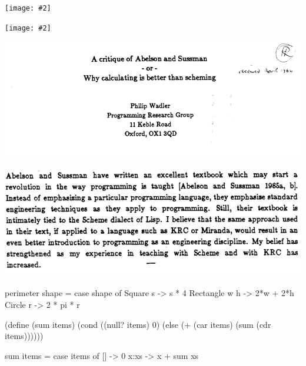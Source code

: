\documentclass[UKenglish,usenames,dvipsnames,svgnames,table,aspectratio=169,mathserif]{beamer}
\newcommand{\nl}{\vspace{\baselineskip}}
\newcommand{\pnl}{\pause \nl}
\newcommand{\imageslide}[2][1]{{
\begin{frame}\begin{center}
\texttt{[image: \#2]}
\end{center}\end{frame}
}}
\begin{document}
\imageslide[0.6]{language-levels.png}

\imageslide[0.5]{design-recipe.png}



\begin{frame}
\centering
\includegraphics[scale=0.5]{wadler-title.png}
\end{frame}


\begin{frame}
\centering
\includegraphics[scale=0.55]{wadler-abstract.png}
\end{frame}

\begin{frame}[fragile]
\begin{haskellcode}
perimeter shape =
  case shape of
    Square s      -> s * 4
    Rectangle w h -> 2*w + 2*h
    Circle r      -> 2 * pi * r
\end{haskellcode}
\end{frame}


\begin{frame}[fragile]
\begin{schemecode}
(define (sum items)
  (cond ((null? items) 0)
        (else (+ (car items) (sum (cdr items))))))
\end{schemecode}

\pnl

\begin{haskellcode}
sum items = case items of
  []   -> 0
  x:xs -> x + sum xs
\end{haskellcode}
\end{frame}
\end{document}
